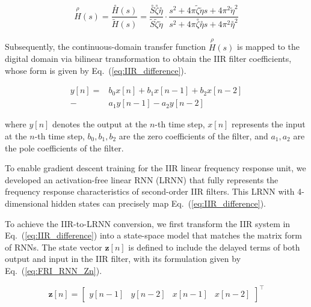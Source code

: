\documentclass[journal]{IEEEtran}
\newcommand{\fn}{\eta} %
\newcommand{\Sen}{S} %
\newcommand{\relative}[1]{\overset{\rho}{#1}} %
\newcommand{\ideal}[1]{\overset{\circ}{#1}} %
\newcommand{\exam}[1]{\tilde{#1}} %
\begin{document}
\begin{equation}
    \relative{H}(s)  = \frac{\ideal{H}(s)}{\exam{H}(s)}
    = \frac{\ideal{S}\ideal{\zeta}  \ideal{\fn} }{\exam{\Sen} \exam{\zeta}  \exam{\fn} } \cdot
    \frac{s^2 + 4\pi \exam{\zeta}  \exam{\fn}   s + 4\pi^2 \exam{\fn} ^2}{s^2 + 4\pi \ideal{\zeta}  \ideal{\fn}   s + 4\pi^2 \ideal{\fn} ^2}
    \label{eq:FRIRNN_relative}
\end{equation}

Subsequently, the continuous-domain transfer function $\relative{H}(s)$ is mapped to the digital domain via bilinear transformation to obtain the IIR filter coefficients, whose form is given by Eq.~(\ref{eq:IIR_difference}).

\begin{equation}
    \begin{aligned}
        y[n]  = & b_0 x[n] + b_1 x[n-1] + b_2 x[n-2] \\
              - & a_1 y[n-1] - a_2 y[n-2]
    \end{aligned}
    \label{eq:IIR_difference}
\end{equation}


    where $ y[n] $ denotes the output at the $ n $-th time step, $ x[n] $ represents the input at the $ n $-th time step, $ b_0, b_1, b_2 $ are the zero coefficients of the filter, and $ a_1, a_2 $ are the pole coefficients of the filter.


    To enable gradient descent training for the IIR linear frequency response unit, we developed an activation-free linear RNN (LRNN) that fully represents the frequency response characteristics of second-order IIR filters. This LRNN with 4-dimensional hidden states can precisely map Eq.~(\ref{eq:IIR_difference}).




To achieve the IIR-to-LRNN conversion, we first transform the IIR system in Eq.~(\ref{eq:IIR_difference}) into a state-space model that matches the matrix form of RNNs. The state vector $\mathbf{z}[n]$ is defined to include the delayed terms of both output and input in the IIR filter, with its formulation given by Eq.~(\ref{eq:FRI_RNN_Zn}).


          \begin{equation}
              \mathbf{z}[n] = \begin{bmatrix} y[n-1] & y[n-2] & x[n-1] & x[n-2] \end{bmatrix}^\top
              \label{eq:FRI_RNN_Zn}
          \end{equation}
\end{document}
